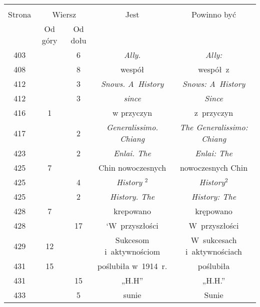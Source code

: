 \documentclass[a4paper,11pt]{article}
\numberwithin{equation}{section}
\begin{document}
\begin{center}
  \begin{tabular}{|c|c|c|c|c|}
    \hline
    & \multicolumn{2}{c|}{} & & \\
    Strona & \multicolumn{2}{c|}{Wiersz} & Jest
    & Powinno być \\ \cline{2-3}
    & Od góry & Od dołu & & \\
    \hline
    403 & &  6 & \textit{Ally.} & \textit{Ally:} \\
    408 & &  8 & wespół & wespół~z \\
    412 & &  3 & \textit{Snows. A~History} & \textit{Snows: A~History} \\
    412 & &  3 & \textit{since} & \textit{Since} \\
    416 &  1 & & w przyczyn & z~przyczyn \\
    417 & &  2 & \textit{Generalissimo. Chiang}
           & \textit{The Generalissimo: Chiang} \\
    423 & &  2 & \textit{Enlai. The} & \textit{Enlai: The} \\
    425 &  7 & & Chin nowoczesnych & nowoczesnych Chin \\
    425 & &  4 & \textit{History} $^{ 2 }$ & \textit{History}$^{ 2 }$ \\
    425 & &  2 & \textit{History. The} & \textit{History: The} \\
    428 &  7 & & krepowano & krępowano \\
    428 & & 17 & `W~przyszłości & W~przyszłości \\
    429 & 12 & & Sukcesom i~aktywnościom & W~sukcesach i~aktywnościach \\
    431 & 15 & & poślubiła w~1914~r. & poślubiła \\
    431 & & 15 & „H.H” & „H.H.” \\
    433 & &  5 & sunie & Sunie \\

\end{tabular}
\end{center}
\end{document}
